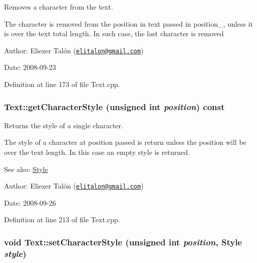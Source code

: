 Removes a character from the text. 

The character is removed from the position in text passed in position\_\-, unless it is over the text total length. In such case, the last character is removed

\begin{Desc}
\item[Author:]Eliezer Talón (\href{mailto:elitalon@gmail.com}{\tt elitalon@gmail.com}) \end{Desc}
\begin{Desc}
\item[Date:]2008-09-23 \end{Desc}


Definition at line 173 of file Text.cpp.\hypertarget{class_text_7fec452bd51b06b53fbb5abc9c335459}{
\subsubsection[getCharacterStyle]{ Text::getCharacterStyle (unsigned int {\em position}) const}}
\label{class_text_7fec452bd51b06b53fbb5abc9c335459}


Returns the style of a single character. 

The style of a character at position passed is return unless the position will be over the text length. In this case an empty style is returned.

\begin{Desc}
\item[See also:]\hyperlink{class_style}{Style}\end{Desc}
\begin{Desc}
\item[Author:]Eliezer Talón (\href{mailto:elitalon@gmail.com}{\tt elitalon@gmail.com}) \end{Desc}
\begin{Desc}
\item[Date:]2008-09-26 \end{Desc}


Definition at line 213 of file Text.cpp.\hypertarget{class_text_7cf2efca7fdd4d7b04292e373d5c2e5e}{
\subsubsection[setCharacterStyle]{\setlength{\rightskip}{0pt plus 5cm}void Text::setCharacterStyle (unsigned int {\em position}, \/  {\bf Style} {\em style})}}
\label{class_text_7cf2efca7fdd4d7b04292e373d5c2e5e}


